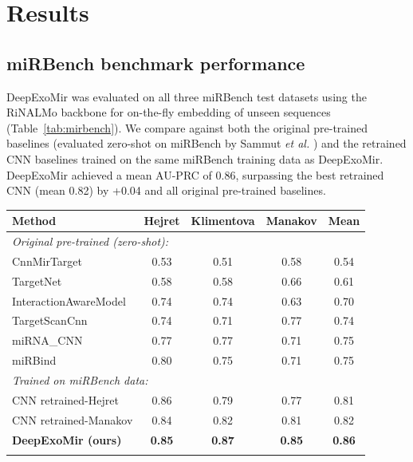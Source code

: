 \documentclass[unnumsec,webpdf,contemporary,large]{oup-authoring-template}
\begin{document}
\section{Results}

\subsection{miRBench benchmark performance}

DeepExoMir was evaluated on all three miRBench test datasets using the RiNALMo backbone for on-the-fly embedding of unseen sequences (Table~\ref{tab:mirbench}). We compare against both the original pre-trained baselines (evaluated zero-shot on miRBench by Sammut \textit{et al.} \citep{sammut2025}) and the retrained CNN baselines trained on the same miRBench training data as DeepExoMir. DeepExoMir achieved a mean AU-PRC of 0.86, surpassing the best retrained CNN (mean 0.82) by +0.04 and all original pre-trained baselines.

\begin{table}[!t]
{\begin{tabular}{@{}lcccc@{}}
\toprule
Method & Hejret & Klimentova & Manakov & Mean \\
\midrule
\multicolumn{5}{l}{\textit{Original pre-trained (zero-shot):}} \\
CnnMirTarget & 0.53 & 0.51 & 0.58 & 0.54 \\
TargetNet & 0.58 & 0.58 & 0.66 & 0.61 \\
InteractionAwareModel & 0.74 & 0.74 & 0.63 & 0.70 \\
TargetScanCnn & 0.74 & 0.71 & 0.77 & 0.74 \\
miRNA\_CNN & 0.77 & 0.77 & 0.71 & 0.75 \\
miRBind & 0.80 & 0.75 & 0.71 & 0.75 \\
\midrule
\multicolumn{5}{l}{\textit{Trained on miRBench data:}} \\
CNN retrained-Hejret & 0.86 & 0.79 & 0.77 & 0.81 \\
CNN retrained-Manakov & 0.84 & 0.82 & 0.81 & 0.82 \\
\textbf{DeepExoMir (ours)} & \textbf{0.85} & \textbf{0.87} & \textbf{0.85} & \textbf{0.86} \\
\botrule
\end{tabular}}{}
\end{table}
\end{document}
